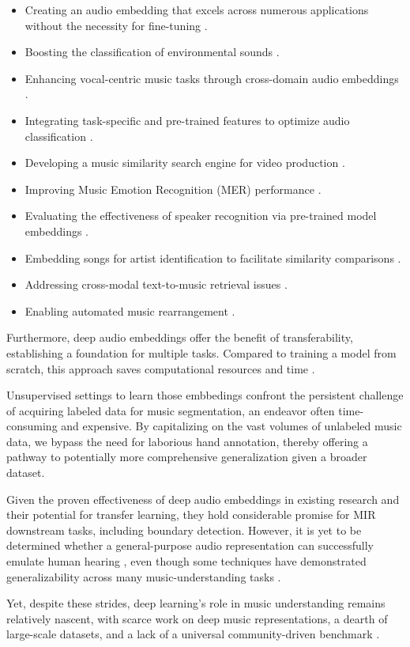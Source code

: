 \begin{itemize}
\item Creating an audio embedding that excels across numerous applications without the necessity for fine-tuning \cite{Turian2022HEAR:Representations}.
\item Boosting the classification of environmental sounds \cite{CramerLOOKEMBEDDINGS}.
\item Enhancing vocal-centric music tasks through cross-domain audio embeddings \cite{Kim2021LearningLoss}.
\item Integrating task-specific and pre-trained features to optimize audio classification \cite{Hung2022Feature-informedClassification}.
\item Developing a music similarity search engine for video production \cite{epidemic}.
\item Improving Music Emotion Recognition (MER) performance \cite{KohComparisonRecognition}.
\item Evaluating the effectiveness of speaker recognition via pre-trained model embeddings \cite{lightweight}.
\item Embedding songs for artist identification to facilitate similarity comparisons \cite{contentmusicsimtriplet2020}.
\item Addressing cross-modal text-to-music retrieval issues \cite{WonEmotionStories}.
\item Enabling automated music rearrangement \cite{Stoller2018IntuitiveTransitions, Plachouras2023MusicSegmentation}.
\end{itemize}

Furthermore, deep audio embeddings offer the benefit of transferability, establishing a foundation for multiple tasks. Compared to training a model from scratch, this approach saves computational resources and time \cite{transferMIR2013, CifkaDeepTransfer, Ding2023AudioClassification}.

Unsupervised settings to learn those embbedings confront the persistent challenge of acquiring labeled data for music segmentation, an endeavor often time-consuming and expensive. By capitalizing on the vast volumes of unlabeled music data, we bypass the need for laborious hand annotation, thereby offering a pathway to potentially more comprehensive generalization given a broader dataset.

Given the proven effectiveness of deep audio embeddings in existing research and their potential for transfer learning, they hold considerable promise for MIR downstream tasks, including boundary detection. However, it is yet to be determined whether a general-purpose audio representation can successfully emulate human hearing \cite{Turian2022HEAR:Representations}, even though some techniques have demonstrated generalizability across many music-understanding tasks \cite{Li2023MERT:Training, Kim2020OneStrategies}.

Yet, despite these strides, deep learning's role in music understanding remains relatively nascent, with scarce work on deep music representations, a dearth of large-scale datasets, and a lack of a universal community-driven benchmark \cite{Turian2022HEAR:Representations, Yuan2023MARBLE:Evaluation}.